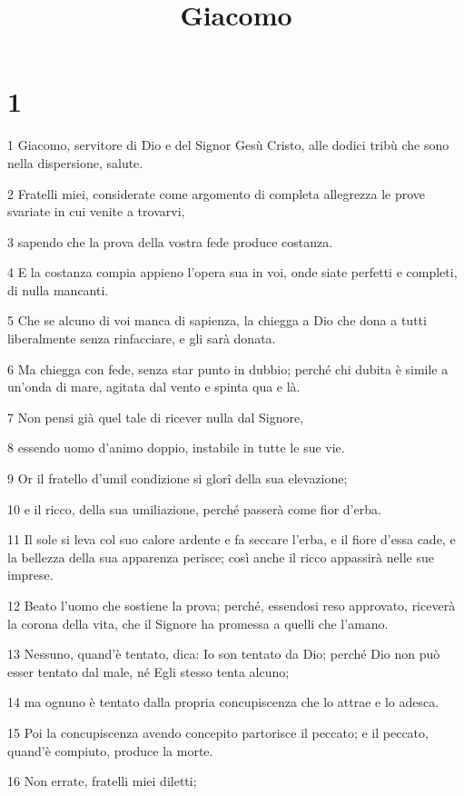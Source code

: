 

\title{Giacomo}


\chapter{1}

\par 1 Giacomo, servitore di Dio e del Signor Gesù Cristo, alle dodici tribù che sono nella dispersione, salute.
\par 2 Fratelli miei, considerate come argomento di completa allegrezza le prove svariate in cui venite a trovarvi,
\par 3 sapendo che la prova della vostra fede produce costanza.
\par 4 E la costanza compia appieno l'opera sua in voi, onde siate perfetti e completi, di nulla mancanti.
\par 5 Che se alcuno di voi manca di sapienza, la chiegga a Dio che dona a tutti liberalmente senza rinfacciare, e gli sarà donata.
\par 6 Ma chiegga con fede, senza star punto in dubbio; perché chi dubita è simile a un'onda di mare, agitata dal vento e spinta qua e là.
\par 7 Non pensi già quel tale di ricever nulla dal Signore,
\par 8 essendo uomo d'animo doppio, instabile in tutte le sue vie.
\par 9 Or il fratello d'umil condizione si glorî della sua elevazione;
\par 10 e il ricco, della sua umiliazione, perché passerà come fior d'erba.
\par 11 Il sole si leva col suo calore ardente e fa seccare l'erba, e il fiore d'essa cade, e la bellezza della sua apparenza perisce; così anche il ricco appassirà nelle sue imprese.
\par 12 Beato l'uomo che sostiene la prova; perché, essendosi reso approvato, riceverà la corona della vita, che il Signore ha promessa a quelli che l'amano.
\par 13 Nessuno, quand'è tentato, dica: Io son tentato da Dio; perché Dio non può esser tentato dal male, né Egli stesso tenta alcuno;
\par 14 ma ognuno è tentato dalla propria concupiscenza che lo attrae e lo adesca.
\par 15 Poi la concupiscenza avendo concepito partorisce il peccato; e il peccato, quand'è compiuto, produce la morte.
\par 16 Non errate, fratelli miei diletti;

